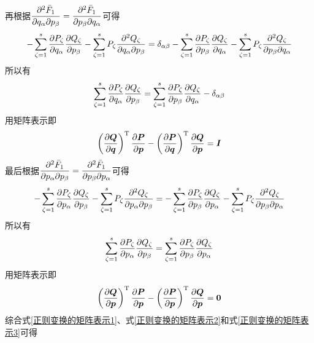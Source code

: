 再根据$\dfrac{\partial^2 \bar{F}_1}{\partial q_\alpha \partial p_\beta} = \dfrac{\partial^2 \bar{F}_1}{\partial p_\beta \partial q_\alpha}$可得
\begin{equation*}
	-\sum_{\zeta=1}^s \frac{\partial P_\zeta}{\partial q_\alpha} \frac{\partial Q_\zeta}{\partial p_\beta} - \sum_{\zeta=1}^s P_\zeta \frac{\partial^2 Q_\zeta}{\partial q_\alpha \partial p_\beta} = \delta_{\alpha\beta}-\sum_{\zeta=1}^s \frac{\partial P_\zeta}{\partial p_\beta} \frac{\partial Q_\zeta}{\partial q_\alpha} - \sum_{\zeta=1}^s P_\zeta \frac{\partial^2 Q_\zeta}{\partial p_\beta \partial q_\alpha}
\end{equation*}
所以有
\begin{equation*}
	\sum_{\zeta=1}^s \frac{\partial P_\zeta}{\partial q_\alpha} \frac{\partial Q_\zeta}{\partial p_\beta} = \sum_{\zeta=1}^s \frac{\partial P_\zeta}{\partial p_\beta} \frac{\partial Q_\zeta}{\partial q_\alpha} - \delta_{\alpha\beta}
\end{equation*}
用矩阵表示即
\begin{equation}
	\left(\frac{\partial \boldsymbol{Q}}{\partial \boldsymbol{q}}\right)^{\mathrm{T}} \frac{\partial \boldsymbol{P}}{\partial \boldsymbol{p}} - \left(\frac{\partial \boldsymbol{P}}{\partial \boldsymbol{q}}\right)^{\mathrm{T}} \frac{\partial \boldsymbol{Q}}{\partial \boldsymbol{p}} = \boldsymbol{I}
	\label{正则变换的矩阵表示2}
\end{equation}
最后根据$\dfrac{\partial^2 \bar{F}_1}{\partial p_\alpha \partial p_\beta} = \dfrac{\partial^2 \bar{F}_1}{\partial p_\beta \partial p_\alpha}$可得
\begin{equation*}
	-\sum_{\zeta=1}^s \frac{\partial P_\zeta}{\partial p_\alpha} \frac{\partial Q_\zeta}{\partial p_\beta} - \sum_{\zeta=1}^s P_\zeta \frac{\partial^2 Q_\zeta}{\partial p_\alpha \partial p_\beta} = -\sum_{\zeta=1}^s \frac{\partial P_\zeta}{\partial p_\beta} \frac{\partial Q_\zeta}{\partial p_\alpha} - \sum_{\zeta=1}^s P_\zeta \frac{\partial^2 Q_\zeta}{\partial p_\beta \partial p_\alpha}
\end{equation*}
所以有
\begin{equation*}
	\sum_{\zeta=1}^s \frac{\partial P_\zeta}{\partial p_\alpha} \frac{\partial Q_\zeta}{\partial p_\beta} = \sum_{\zeta=1}^s \frac{\partial P_\zeta}{\partial p_\beta} \frac{\partial Q_\zeta}{\partial p_\alpha}
\end{equation*}
用矩阵表示即
\begin{equation}
	\left(\frac{\partial \boldsymbol{Q}}{\partial \boldsymbol{p}}\right)^{\mathrm{T}} \frac{\partial \boldsymbol{P}}{\partial \boldsymbol{p}} - \left(\frac{\partial \boldsymbol{P}}{\partial \boldsymbol{p}}\right)^{\mathrm{T}} \frac{\partial \boldsymbol{Q}}{\partial \boldsymbol{p}} = \boldsymbol{0}
	\label{正则变换的矩阵表示3}
\end{equation}
综合式\eqref{正则变换的矩阵表示1}、式\eqref{正则变换的矩阵表示2}和式\eqref{正则变换的矩阵表示3}可得

